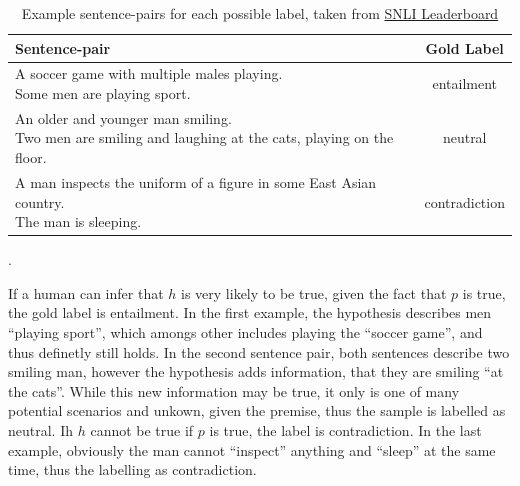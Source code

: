 \begin{table}[tph!]
\centering
\begin{tabular}{lc}
\textbf{Sentence-pair} & \textbf{Gold Label} \\
\toprule
\specialcell{A soccer game with multiple males playing.\\Some men are playing sport.} & entailment \\
\midrule
\specialcell{An older and younger man smiling.\\Two men are smiling and laughing at the cats, playing on the floor.} & neutral \\
\midrule
\specialcell{A man inspects the uniform of a figure in some East Asian country.\\The man is sleeping.} & contradiction\\
\bottomrule
\end{tabular}
\label{tab:label_examples}
\caption{Example sentence-pairs for each possible label, taken from \href{https://nlp.stanford.edu/projects/snli/}{SNLI Leaderboard}}.
\end{table}
If a human can infer that $h$ is very likely to be true, given the fact that $p$ is true, the gold label is entailment. In the first example, the hypothesis describes men ``playing sport'', which amongs other includes playing the ``soccer game'', and thus definetly still holds. In the second sentence pair, both sentences describe two smiling man, however the hypothesis adds information, that they are smiling ``at the cats''. While this new information may be true, it only is one of many potential scenarios and unkown, given the premise, thus the sample is labelled as neutral. Ih $h$ cannot be true if $p$ is true, the label is contradiction. In the last example, obviously the man cannot ``inspect'' anything and ``sleep'' at the same time, thus the labelling as contradiction.

